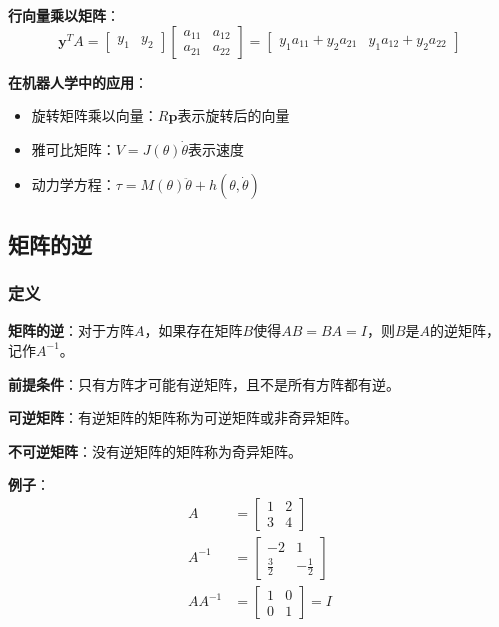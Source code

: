 \documentclass[12pt,a4paper]{article}
\begin{document}
\textbf{行向量乘以矩阵}：
\begin{equation}
\bm{y}^T A = \begin{bmatrix} y_1 & y_2 \end{bmatrix} \begin{bmatrix} a_{11} & a_{12} \\ a_{21} & a_{22} \end{bmatrix} = \begin{bmatrix} y_1 a_{11} + y_2 a_{21} & y_1 a_{12} + y_2 a_{22} \end{bmatrix}
\end{equation}

\textbf{在机器人学中的应用}：
\begin{itemize}
\item 旋转矩阵乘以向量：$R \bm{p}$表示旋转后的向量
\item 雅可比矩阵：$V = J(\theta) \dot{\theta}$表示速度
\item 动力学方程：$\tau = M(\theta) \ddot{\theta} + h(\theta, \dot{\theta})$
\end{itemize}

\subsection{矩阵的逆}

\subsubsection{定义}

\textbf{矩阵的逆}：对于方阵$A$，如果存在矩阵$B$使得$AB = BA = I$，则$B$是$A$的逆矩阵，记作$A^{-1}$。

\textbf{前提条件}：只有方阵才可能有逆矩阵，且不是所有方阵都有逆。

\textbf{可逆矩阵}：有逆矩阵的矩阵称为可逆矩阵或非奇异矩阵。

\textbf{不可逆矩阵}：没有逆矩阵的矩阵称为奇异矩阵。

\textbf{例子}：
\begin{align}
A &= \begin{bmatrix} 1 & 2 \\ 3 & 4 \end{bmatrix} \\
A^{-1} &= \begin{bmatrix} -2 & 1 \\ \frac{3}{2} & -\frac{1}{2} \end{bmatrix} \\
AA^{-1} &= \begin{bmatrix} 1 & 0 \\ 0 & 1 \end{bmatrix} = I
\end{align}
\end{document}
